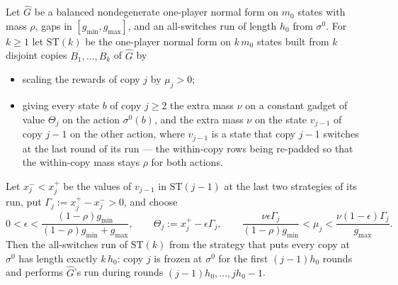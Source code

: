 \begin{theorem}\label{oph:stack}
Let $\widehat G$ be a balanced nondegenerate one-player normal form on $m_0$ states
with mass $\rho$, gaps in $[g_{\min},g_{\max}]$, and an all-switches run of length
$h_0$ from $\sigma^{0}$. For $k\ge1$ let $\mathrm{ST}(k)$ be the one-player normal form
on $k\,m_0$ states built from $k$ disjoint copies $B_1,\dots,B_k$ of $\widehat G$ by
\begin{itemize}[leftmargin=1.4em]
\item scaling the rewards of copy $j$ by $\mu_j>0$;
\item giving every state $b$ of copy $j\ge2$ the extra mass $\nu$ on a constant
      gadget of value $\Theta_j$ on the action $\sigma^{0}(b)$, and the extra mass
      $\nu$ on the state $v_{j-1}$ of copy $j-1$ on the other action, where $v_{j-1}$
      is a state that copy $j-1$ switches at the last round of its run --- the
      within-copy rows being re-padded so that the within-copy mass stays $\rho$ for
      both actions.
\end{itemize}
Let $x^{-}_j<x^{+}_j$ be the values of $v_{j-1}$ in $\mathrm{ST}(j-1)$ at the last two
strategies of its run, put $\Gamma_j:=x^{+}_j-x^{-}_j>0$, and choose
\[
  0<\epsilon<\frac{(1-\rho)g_{\min}}{(1-\rho)g_{\min}+g_{\max}},\qquad
  \Theta_j:=x^{+}_j-\epsilon\Gamma_j,\qquad
  \frac{\nu\epsilon\Gamma_j}{(1-\rho)g_{\min}}<\mu_j<\frac{\nu(1-\epsilon)\Gamma_j}{g_{\max}} .
\]
Then the all-switches run of $\mathrm{ST}(k)$ from the strategy that puts every copy at
$\sigma^{0}$ has length exactly $k\,h_0$: copy $j$ is frozen at $\sigma^{0}$ for the
first $(j-1)h_0$ rounds and performs $\widehat G$'s run during rounds
$(j-1)h_0,\dots,jh_0-1$.
\end{theorem}

